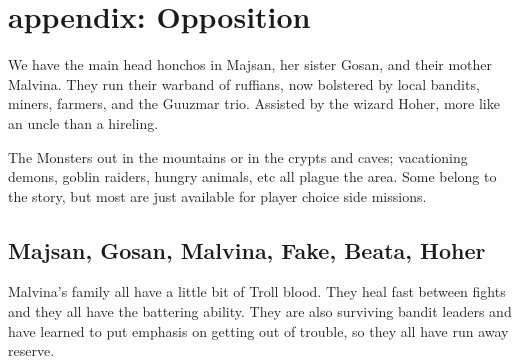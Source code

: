 \section*{appendix: Opposition}
We have the main head honchos in Majsan, her sister Gosan, and their mother Malvina. They run their warband of ruffians, now bolstered by local bandits, miners, farmers, and the Guuzmar trio. Assisted by the wizard Hoher, more like an uncle than a hireling.

The Monsters out in the mountains or in the crypts and caves; vacationing demons, goblin raiders, hungry animals, etc all plague the area. Some belong to the story, but most are just available for player choice side missions.





\subsection*{Majsan, Gosan, Malvina, Fake, Beata, Hoher}
Malvina's family all have a little bit of Troll blood. They heal fast between fights and they all have the battering ability. They are also surviving bandit leaders and have learned to put emphasis on getting out of trouble, so they all have run away reserve.



